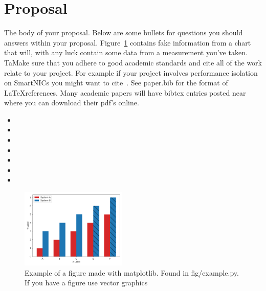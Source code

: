 \section{Proposal}

The body of your proposal. Below are some bullets for questions you should
answers within your proposal. Figure~\ref{fig:example} contains fake information
from a chart that will, with any luck contain some data from a measurement
you've taken. TaMake sure that you adhere to good academic standards and cite all
of the work relate to your project. For example if your project involves
performance isolation on SmartNICs you might want to cite~\cite{fairnic}. See
paper.bib for the format of \LaTeX references. Many academic papers will have
bibtex entries posted near where you can download their pdf's online.


\begin{itemize}
    \item{}
    \item{}
    \item{}
    \item{}
    \item{}
    \item{}
    \item{}
\end{itemize}

\begin{figure}[H]
    \includegraphics[width=0.45\textwidth]{fig/example.pdf}
    \caption{Example of a figure made with matplotlib. Found in fig/example.py. If you have a figure use vector graphics}
    \label{fig:example}
    \vspace*{-13.00mm}
\end{figure}

